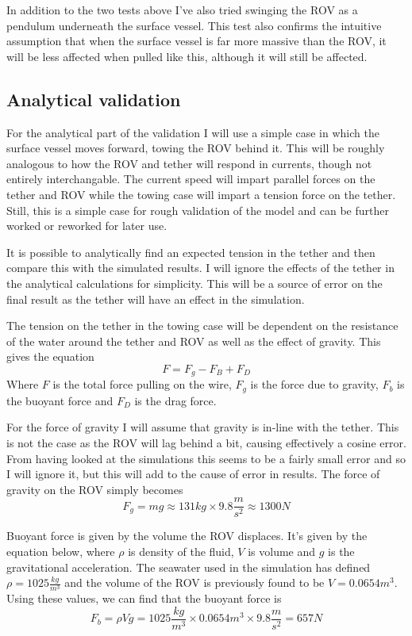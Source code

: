 In addition to the two tests above I've also tried swinging the ROV as a pendulum underneath the surface vessel. This test also confirms the intuitive assumption that when the surface vessel is far more massive than the ROV, it will be less affected when pulled like this, although it will still be affected. 

\subsection{Analytical validation}
\label{sec:anal}
For the analytical part of the validation I will use a simple case in which the surface vessel moves forward, towing the ROV behind it. This will be roughly analogous to how the ROV and tether will respond in currents, though not entirely interchangable. The current speed will impart parallel forces on the tether and ROV while the towing case will impart a tension force on the tether. Still, this is a simple case for rough validation of the model and can be further worked or reworked for later use.

It is possible to analytically find an expected tension in the tether and then compare this with the simulated results. I will ignore the effects of the tether in the analytical calculations for simplicity. This will be a source of error on the final result as the tether will have an effect in the simulation.

The tension on the tether in the towing case will be dependent on the resistance of the water around the tether and ROV as well as the effect of gravity. This gives the equation 
\[F = F_g - F_B + F_D\]
Where \(F\) is the total force pulling on the wire, \(F_g\) is the force due to gravity, \(F_b\) is the buoyant force and \(F_D\) is the drag force. 

For the force of gravity I will assume that gravity is in-line with the tether. This is not the case as the ROV will lag behind a bit, causing effectively a cosine error. From having looked at the simulations this seems to be a fairly small error and so I will ignore it, but this will add to the cause of error in results. The force of gravity on the ROV simply becomes 
\[F_g = m g \approx 131kg \times 9.8\frac{m}{s^2} \approx 1300N\] 

Buoyant force is given by the volume the ROV displaces. It's given by the equation below, where \(\rho\) is density of the fluid, \(V\) is volume and \(g\) is the gravitational acceleration. The seawater used in the simulation has defined \(\rho = 1025\frac{kg}{m^3}\) and the volume of the ROV is previously found to be \(V=0.0654m^3\). Using these values, we can find that the buoyant force is 
\[F_b = \rho V g = 1025\frac{kg}{m^3} \times 0.0654m^3 \times 9.8\frac{m}{s^2} = 657N\]

